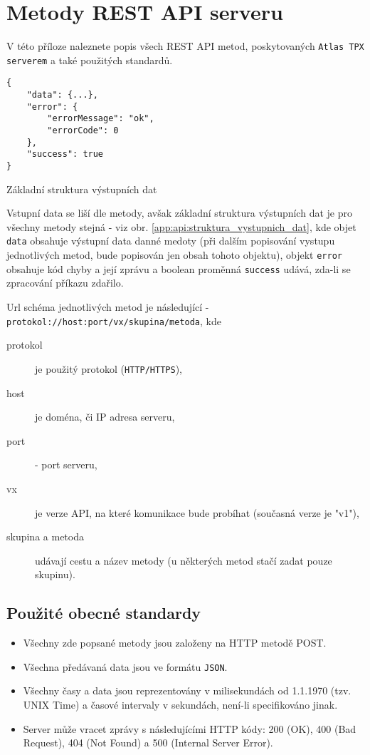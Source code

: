 

\chapter{Metody REST API serveru}\label{app:api}
V této příloze naleznete popis všech REST API metod, poskytovaných \texttt{Atlas TPX serverem} a také použitých standardů.

\begin{verbatim} 
{
	"data": {...},
	"error": {
		"errorMessage": "ok",
		"errorCode": 0
	},
	"success": true
}
\end{verbatim}
\sloppy
\begin{code}[h!]
	\caption{Základní struktura výstupních dat}
	\label{app:api:struktura_vystupnich_dat}
\end{code}

Vstupní data se liší dle metody, avšak základní struktura výstupních dat je pro všechny metody stejná - viz obr. \ref{app:api:struktura_vystupnich_dat}, kde objet \texttt{data} obsahuje výstupní data danné medoty (při dalším popisování vystupu jednotlivých metod, bude popisován jen obsah tohoto objektu), objekt \texttt{error} obsahuje kód chyby a její zprávu a boolean proměnná \texttt{success} udává, zda-li se zpracování příkazu zdařilo.

Url schéma jednotlivých metod je následující - \texttt{protokol://host:port/vx/skupina/metoda}, kde
\begin{description}
	\item[protokol] je použitý protokol (\texttt{HTTP/HTTPS}),
	\item[host] je doména, či IP adresa serveru,
	\item[port] - port serveru,
	\item[vx] je verze API, na které komunikace bude probíhat (současná verze je "v1"),
	\item[skupina a metoda] udávají cestu a název metody (u některých metod stačí zadat pouze skupinu).
\end{description}

\section{Použité obecné standardy}
\begin{itemize}
	\item Všechny zde popsané metody jsou založeny na HTTP metodě POST.
	\item Všechna předávaná data jsou ve formátu \texttt{JSON}. 
	\item Všechny časy a data jsou reprezentovány v milisekundách od 1.1.1970 (tzv. UNIX Time) a časové intervaly v sekundách, není-li specifikováno jinak.
	\item Server může vracet zprávy s následujícími HTTP kódy: 200 (OK), 400 (Bad Request), 404 (Not Found) a 500 (Internal Server Error).
\end{itemize}

